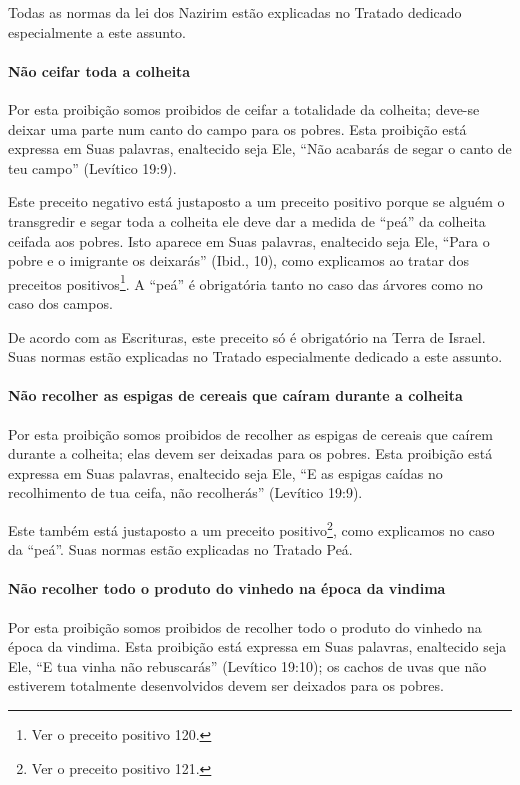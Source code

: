 Todas as normas da lei dos Nazirim estão explicadas no Tratado dedicado
especialmente a este assunto.

\paragraph{Não ceifar toda a colheita}

Por esta proibição somos proibidos de ceifar a totalidade da colheita;
deve-se deixar uma parte num canto do campo para os pobres. Esta
proibição está expressa em Suas palavras, enaltecido seja Ele, ``Não
acabarás de segar o canto de teu campo'' (Levítico 19:9).

Este preceito negativo está justaposto a um preceito positivo porque se
alguém o transgredir e segar toda a colheita ele deve dar a medida de
``peá'' da colheita ceifada aos pobres. Isto aparece em Suas palavras,
enaltecido seja Ele, ``Para o pobre e o imigrante os deixarás'' (Ibid.,
10), como explicamos ao tratar dos preceitos
positivos\footnote{Ver o preceito positivo 120.}. A ``peá'' é obrigatória tanto no caso
das árvores como no caso dos campos.

De acordo com as Escrituras, este preceito só é obrigatório na Terra de
Israel. Suas normas estão explicadas no Tratado especialmente dedicado a
este assunto.

\paragraph{Não recolher as espigas de cereais que caíram durante a colheita}

Por esta proibição somos proibidos de recolher as espigas de cereais que
caírem durante a colheita; elas devem ser deixadas para os pobres. Esta
proibição está expressa em Suas palavras, enaltecido seja Ele, ``E as
espigas caídas no recolhimento de tua ceifa, não recolherás'' (Levítico
19:9).

Este também está justaposto a um preceito
positivo\footnote{Ver o preceito positivo 121.}, como explicamos no caso da ``peá''. Suas normas estão explicadas no Tratado Peá.

\paragraph{Não recolher todo o produto do vinhedo na época da vindima}

Por esta proibição somos proibidos de recolher todo o produto do vinhedo
na época da vindima. Esta proibição está expressa em Suas palavras,
enaltecido seja Ele, ``E tua vinha não rebuscarás'' (Levítico 19:10); os
cachos de uvas que não estiverem totalmente desenvolvidos devem ser
deixados para os pobres.

